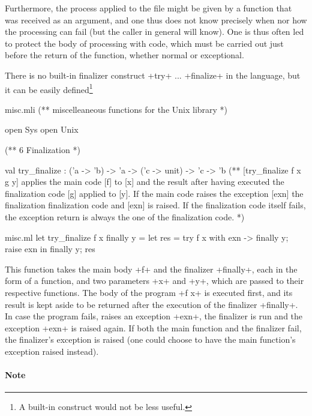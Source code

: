 Furthermore, the process applied to the file might be given by a
function that was received as an argument, and one thus does not know
precisely when nor how the processing can fail (but the caller in
general will know). One is thus often led to protect the body of
processing with  code, which must be carried out
just before the return of the function, whether normal or exceptional.


There is no built-in finalizer construct \ml+try+ ... \ml+finalize+ in
the {\ocaml} language, but it can be easily defined\footnote{A
  built-in construct would not be less useful.}



\begin{codefile}{misc.mli}
(** miscelleaneous functions for the Unix library *)




open Sys
open Unix

(** {6 Finalization} *)

val try_finalize : ('a -> 'b) -> 'a -> ('c -> unit) -> 'c -> 'b
(** [try_finalize f x g y] applies the main code [f] to [x] and
    the result after having executed the finalization 
   code [g] applied to [y]. If the main code raises the exception
   [exn] the finalization finalization code and [exn] is raised.
   If the finalization code itself fails, the exception
   return is always the one of the finalization code. *)
\end{codefile}
%
\begin{listingcodefile}{misc.ml}
let try_finalize f x finally y =
  let res = try f x with exn -> finally y; raise exn in 
  finally y; 
  res
\end{listingcodefile}

%


This function takes the main body \ml+f+ and the finalizer
\ml+finally+, each in the form of a function, and two parameters \ml+x+
and \ml+y+, which are passed to their respective functions. The body
of the program \ml+f x+ is executed first, and its result is kept
aside to be returned after the execution of the finalizer 
\ml+finally+. In case the program fails, \ie raises an exception \ml+exn+,
the finalizer is run and the exception \ml+exn+ is raised
again. If both the main function and the finalizer fail, the
finalizer's exception is raised (one could choose to have the main
function's exception raised instead).

\paragraph{Note}

